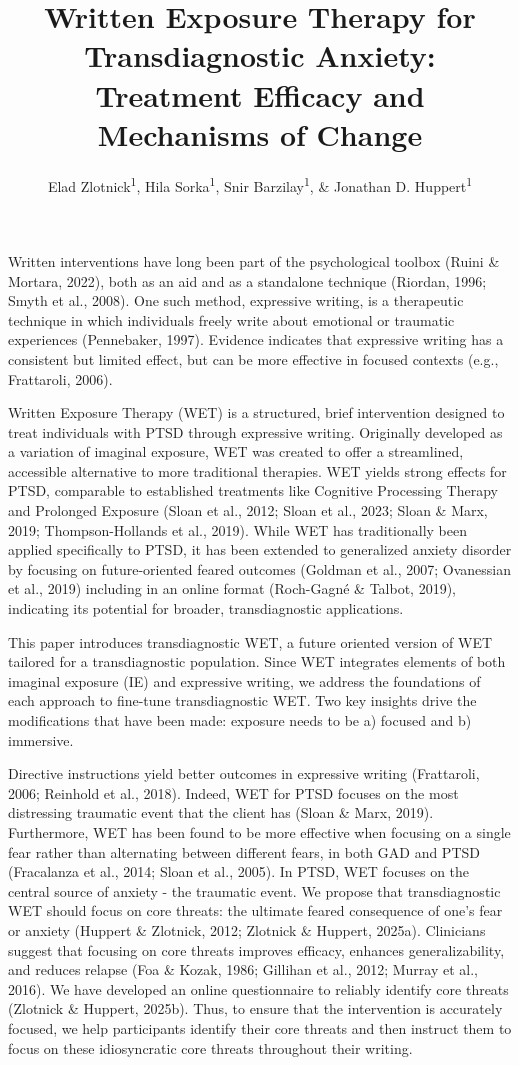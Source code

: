 \documentclass[
  man,floatsintext]{apa7}
\title{Written Exposure Therapy for Transdiagnostic Anxiety: Treatment Efficacy and Mechanisms of Change}
\author{Elad Zlotnick\textsuperscript{1}, Hila Sorka\textsuperscript{1}, Snir Barzilay\textsuperscript{1}, \& Jonathan D. Huppert\textsuperscript{1}}
\date{}
\affiliation{\vspace{0.5cm}\textsuperscript{1} The Hebrew University of Jerusalem}
\begin{document}
\maketitle

Written interventions have long been part of the psychological toolbox (Ruini \& Mortara, 2022),
both as an aid and as a standalone technique (Riordan, 1996; Smyth et al., 2008).
One such method, expressive writing, is a therapeutic technique in which individuals freely write about emotional or traumatic experiences (Pennebaker, 1997).
Evidence indicates that expressive writing has a consistent but limited effect, but can be more effective in focused contexts (e.g., Frattaroli, 2006).

Written Exposure Therapy (WET) is a structured, brief intervention designed to treat individuals with PTSD through expressive writing.
Originally developed as a variation of imaginal exposure, WET was created to offer a streamlined, accessible alternative to more traditional therapies.
WET yields strong effects for PTSD, comparable to established treatments like Cognitive Processing Therapy and Prolonged Exposure (Sloan et al., 2012; Sloan et al., 2023; Sloan \& Marx, 2019; Thompson-Hollands et al., 2019).
While WET has traditionally been applied specifically to PTSD, it has been extended to generalized anxiety disorder by focusing on future-oriented feared outcomes (Goldman et al., 2007; Ovanessian et al., 2019) including in an online format (Roch-Gagné \& Talbot, 2019), indicating its potential for broader, transdiagnostic applications.

This paper introduces transdiagnostic WET, a future oriented version of WET tailored for a transdiagnostic population.
Since WET integrates elements of both imaginal exposure (IE) and expressive writing, we address the foundations of each approach to fine-tune transdiagnostic WET.
Two key insights drive the modifications that have been made: exposure needs to be a) focused and b) immersive.

Directive instructions yield better outcomes in expressive writing (Frattaroli, 2006; Reinhold et al., 2018).
Indeed, WET for PTSD focuses on the most distressing traumatic event that the client has (Sloan \& Marx, 2019).
Furthermore, WET has been found to be more effective when focusing on a single fear rather than alternating between different fears, in both GAD and PTSD (Fracalanza et al., 2014; Sloan et al., 2005).
In PTSD, WET focuses on the central source of anxiety - the traumatic event.
We propose that transdiagnostic WET should focus on core threats: the ultimate feared consequence of one's fear or anxiety (Huppert \& Zlotnick, 2012; Zlotnick \& Huppert, 2025a).
Clinicians suggest that focusing on core threats improves efficacy, enhances generalizability, and reduces relapse
(Foa \& Kozak, 1986; Gillihan et al., 2012; Murray et al., 2016).
We have developed an online questionnaire to reliably identify core threats (Zlotnick \& Huppert, 2025b).
Thus, to ensure that the intervention is accurately focused, we help participants identify their core threats and then instruct them to focus on these idiosyncratic core threats throughout their writing.
\end{document}
